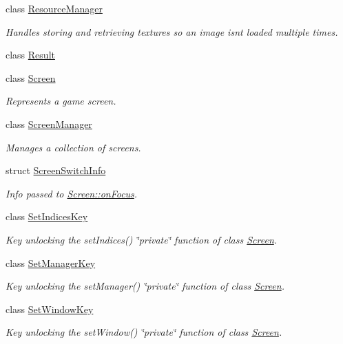 \begin{DoxyCompactItemize}
class \hyperlink{classnta_1_1ResourceManager}{Resource\+Manager}
\begin{DoxyCompactList}\small\item\em Handles storing and retrieving textures so an image isn\textquotesingle{}t loaded multiple times. \end{DoxyCompactList}\item 
class \hyperlink{classnta_1_1Result}{Result}
\item 
class \hyperlink{classnta_1_1Screen}{Screen}
\begin{DoxyCompactList}\small\item\em Represents a game screen. \end{DoxyCompactList}\item 
class \hyperlink{classnta_1_1ScreenManager}{Screen\+Manager}
\begin{DoxyCompactList}\small\item\em Manages a collection of screens. \end{DoxyCompactList}\item 
struct \hyperlink{structnta_1_1ScreenSwitchInfo}{Screen\+Switch\+Info}
\begin{DoxyCompactList}\small\item\em Info passed to \hyperlink{classnta_1_1Screen_a895548cdf2a5170d671983fc9189579a}{Screen\+::on\+Focus}. \end{DoxyCompactList}\item 
class \hyperlink{classnta_1_1SetIndicesKey}{Set\+Indices\+Key}
\begin{DoxyCompactList}\small\item\em Key unlocking the set\+Indices() \char`\"{}private\char`\"{} function of class \hyperlink{classnta_1_1Screen}{Screen}. \end{DoxyCompactList}\item 
class \hyperlink{classnta_1_1SetManagerKey}{Set\+Manager\+Key}
\begin{DoxyCompactList}\small\item\em Key unlocking the set\+Manager() \char`\"{}private\char`\"{} function of class \hyperlink{classnta_1_1Screen}{Screen}. \end{DoxyCompactList}\item 
class \hyperlink{classnta_1_1SetWindowKey}{Set\+Window\+Key}
\begin{DoxyCompactList}\small\item\em Key unlocking the set\+Window() \char`\"{}private\char`\"{} function of class \hyperlink{classnta_1_1Screen}{Screen}. \end{DoxyCompactList}\item 

\end{DoxyCompactItemize}
